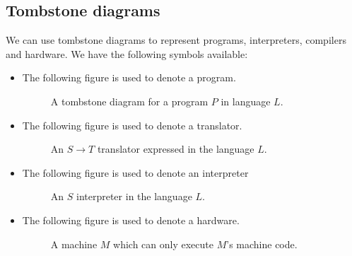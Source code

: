 \documentclass[a4paper, openany]{memoir}
\begin{document}
\subsection{Tombstone diagrams}
We can use tombstone diagrams to represent programs, interpreters, compilers and hardware. We have the following symbols available:
\begin{itemize}
    \item The following figure is used to denote a program.
    \begin{figure}[H]
        \centering
        \caption{A tombstone diagram for a program $P$ in language $L$.}
    \end{figure}
    
    \item The following figure is used to denote a translator.
    \begin{figure}[H]
        \centering
        \caption{An $S \to T$ translator expressed in the language $L$.}
    \end{figure}
    
    \item The following figure is used to denote an interpreter
    \begin{figure}[H]
        \centering
        \caption{An $S$ interpreter in the language $L$.}
    \end{figure}
    
    \item The following figure is used to denote a hardware.
    \begin{figure}[H]
        \centering
        \caption{A machine $M$ which can only execute $M$'s machine code.}
    \end{figure}
\end{itemize}
\end{document}
